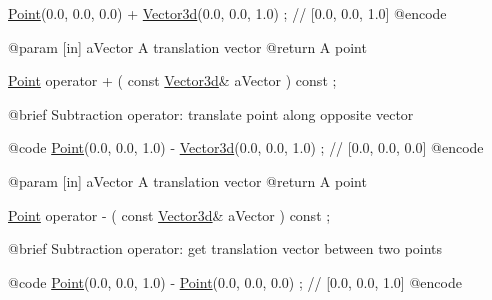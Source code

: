 \begin{DoxyCode}
                        \hyperlink{classlibrary_1_1math_1_1geom_1_1d3_1_1objects_1_1_point_a617e690ab6091af3de729cee337e309e}{Point}(0.0, 0.0, 0.0) + \hyperlink{namespacelibrary_1_1math_1_1obj_a977e84e9bf317a4e7dd9d6d671d6da2f}{Vector3d}(0.0, 0.0, 1.0) ; \textcolor{comment}{// [0.0, 0.0, 1.0]}
    @encode
   
    @param              [in] aVector A translation vector
    @\textcolor{keywordflow}{return}             A point

\hyperlink{classlibrary_1_1math_1_1geom_1_1d3_1_1objects_1_1_point_a617e690ab6091af3de729cee337e309e}{Point}                   operator +                                  (   \textcolor{keyword}{const}   
      \hyperlink{namespacelibrary_1_1math_1_1obj_a977e84e9bf317a4e7dd9d6d671d6da2f}{Vector3d}&                   aVector                                     ) \textcolor{keyword}{const} ;

    @brief              Subtraction \textcolor{keyword}{operator}: translate point along opposite vector
   
    @code
                        \hyperlink{classlibrary_1_1math_1_1geom_1_1d3_1_1objects_1_1_point_a617e690ab6091af3de729cee337e309e}{Point}(0.0, 0.0, 1.0) - \hyperlink{namespacelibrary_1_1math_1_1obj_a977e84e9bf317a4e7dd9d6d671d6da2f}{Vector3d}(0.0, 0.0, 1.0) ; \textcolor{comment}{// [0.0, 0.0, 0.0]}
    @encode
   
    @param              [in] aVector A translation vector
    @\textcolor{keywordflow}{return}             A point

\hyperlink{classlibrary_1_1math_1_1geom_1_1d3_1_1objects_1_1_point_a617e690ab6091af3de729cee337e309e}{Point}                   operator -                                  (   \textcolor{keyword}{const}   
      \hyperlink{namespacelibrary_1_1math_1_1obj_a977e84e9bf317a4e7dd9d6d671d6da2f}{Vector3d}&                   aVector                                     ) \textcolor{keyword}{const} ;

    @brief              Subtraction \textcolor{keyword}{operator}: \textcolor{keyword}{get} translation vector between two points
   
    @code
                        \hyperlink{classlibrary_1_1math_1_1geom_1_1d3_1_1objects_1_1_point_a617e690ab6091af3de729cee337e309e}{Point}(0.0, 0.0, 1.0) - \hyperlink{classlibrary_1_1math_1_1geom_1_1d3_1_1objects_1_1_point_a617e690ab6091af3de729cee337e309e}{Point}(0.0, 0.0, 0.0)  ; \textcolor{comment}{// [0.0, 0.0, 1.0]}
    @encode
   

\end{DoxyCode}
